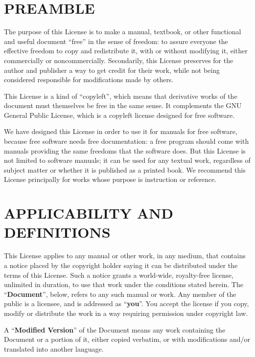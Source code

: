 \def\thesection{\arabic{section}.}
\setcounter{section}{-1}

\section{PREAMBLE}

The purpose of this License is to make a manual, textbook, or other
functional and useful document ``free'' in the sense of freedom: to
assure everyone the effective freedom to copy and redistribute it,
with or without modifying it, either commercially or noncommercially.
Secondarily, this License preserves for the author and publisher a way
to get credit for their work, while not being considered responsible
for modifications made by others.

This License is a kind of ``copyleft'', which means that derivative
works of the document must themselves be free in the same sense.  It
complements the GNU General Public License, which is a copyleft
license designed for free software.

We have designed this License in order to use it for manuals for free
software, because free software needs free documentation: a free
program should come with manuals providing the same freedoms that the
software does.  But this License is not limited to software manuals;
it can be used for any textual work, regardless of subject matter or
whether it is published as a printed book.  We recommend this License
principally for works whose purpose is instruction or reference.


\section{APPLICABILITY AND DEFINITIONS}

This License applies to any manual or other work, in any medium, that
contains a notice placed by the copyright holder saying it can be
distributed under the terms of this License.  Such a notice grants a
world-wide, royalty-free license, unlimited in duration, to use that
work under the conditions stated herein.  The ``\textbf{Document}'', below,
refers to any such manual or work.  Any member of the public is a
licensee, and is addressed as ``\textbf{you}''.  You accept the license if you
copy, modify or distribute the work in a way requiring permission
under copyright law.

A ``\textbf{Modified Version}'' of the Document means any work containing the
Document or a portion of it, either copied verbatim, or with
modifications and/or translated into another language.

